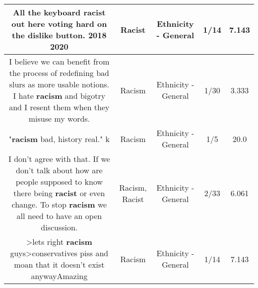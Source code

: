 \documentclass[11pt]{article}
\newlength\mylength
\begin{document}
\begin{center}
\begin{longtable}{|C{.65\mylength}|C{.30\mylength}|C{.12\mylength}|C{.12\mylength}|C{.12\mylength}|}
  \small All the keyboard \textbf{racist} out here voting hard on the dislike button. 2018 2020\normalsize   & Racist & Ethnicity - General & 1/14 & 7.143 \\  \hline
  \small I believe we can benefit from the process of redefining bad slurs as more usable notions.  I hate \textbf{racism} and bigotry and I resent them when they misuse my words.\normalsize   & Racism & Ethnicity - General & 1/30 & 3.333 \\  \hline
  \small "\textbf{racism} bad, history real." k\normalsize   & Racism & Ethnicity - General & 1/5 & 20.0 \\  \hline
  \small I don't agree with that. If we don't talk about how are people supposed to know there being \textbf{racist} or even change. To stop \textbf{racism} we all need to have an open discussion.\normalsize   & Racism, Racist & Ethnicity - General & 2/33 & 6.061 \\  \hline
  \small >lets right \textbf{racism} guys>conservatives piss and moan that it doesn't exist anywayAmazing\normalsize   & Racism & Ethnicity - General & 1/14 & 7.143 \\  \hline

\end{longtable}
\end{center}
\end{document}
